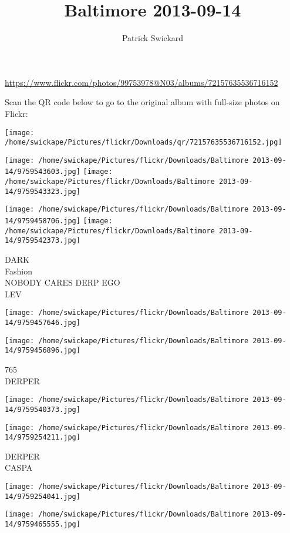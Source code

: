 \documentclass[10pt,letterpaper]{article}
\title{Baltimore 2013-09-14}
\author{Patrick Swickard}
\date{}
\begin{document}
\maketitle

\url{https://www.flickr.com/photos/99753978@N03/albums/72157635536716152}

Scan the QR code below to go to the original album with full-size photos on Flickr:

\texttt{[image: /home/swickape/Pictures/flickr/Downloads/qr/72157635536716152.jpg]}
\pagebreak

\texttt{[image: /home/swickape/Pictures/flickr/Downloads/Baltimore 2013-09-14/9759543603.jpg]}
\texttt{[image: /home/swickape/Pictures/flickr/Downloads/Baltimore 2013-09-14/9759543323.jpg]}

\texttt{[image: /home/swickape/Pictures/flickr/Downloads/Baltimore 2013-09-14/9759458706.jpg]}
\texttt{[image: /home/swickape/Pictures/flickr/Downloads/Baltimore 2013-09-14/9759542373.jpg]}

DARK\\
Fashion\\
NOBODY CARES DERP EGO\\
LEV
\pagebreak

\texttt{[image: /home/swickape/Pictures/flickr/Downloads/Baltimore 2013-09-14/9759457646.jpg]}

\vspace{0.25in}
\texttt{[image: /home/swickape/Pictures/flickr/Downloads/Baltimore 2013-09-14/9759456896.jpg]}

765\\
DERPER
\pagebreak

\texttt{[image: /home/swickape/Pictures/flickr/Downloads/Baltimore 2013-09-14/9759540373.jpg]}

\vspace{0.25in}
\texttt{[image: /home/swickape/Pictures/flickr/Downloads/Baltimore 2013-09-14/9759254211.jpg]}

DERPER\\
CASPA
\pagebreak

\texttt{[image: /home/swickape/Pictures/flickr/Downloads/Baltimore 2013-09-14/9759254041.jpg]}

\vspace{0.25in}
\texttt{[image: /home/swickape/Pictures/flickr/Downloads/Baltimore 2013-09-14/9759465555.jpg]}
\end{document}
